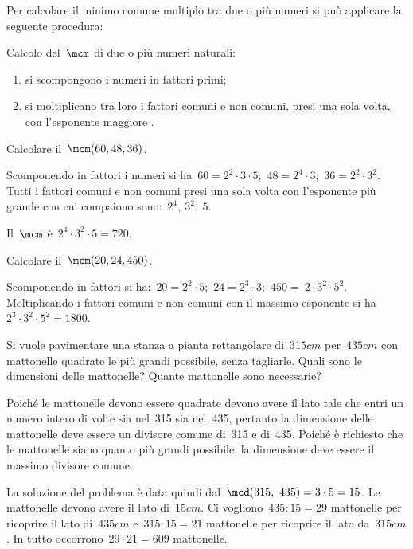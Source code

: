 Per calcolare il minimo comune multiplo tra due o più numeri si può 
applicare la seguente procedura:

\begin{procedura}{}{}
Calcolo del~\(\mcm\) di due o più numeri naturali:
\begin{enumerate}[noitemsep, label=(\alph*)]
 \item si scompongono i numeri in fattori primi;
 \item si moltiplicano tra loro i fattori comuni e non comuni, 
  presi una sola volta, con l'esponente maggiore .
\end{enumerate}
\end{procedura}


 \begin{esempio}{}{}
 Calcolare il~\(\mcm(60,48,36)\).

Scomponendo in fattori i numeri si 
ha~\(60=2^2\cdot3\cdot5\);~\(48=2^4\cdot3\);~\(36 =2^2\cdot3^2\).
Tutti i fattori comuni e non comuni presi una sola volta con l'esponente 
più grande con cui compaiono sono:~\(2^4,~3^2,~5\).

Il~\(\mcm\) è~\(2^4\cdot3^2\cdot5=720\).
 \end{esempio}

 \begin{esempio}{}{}
 Calcolare il~\(\mcm(20,24,450)\).

Scomponendo in fattori si 
ha:~\(20=2^2\cdot5\);~\(24=2^3\cdot3\);~\(450 =~2\cdot3^2\cdot5^2\).
Moltiplicando i fattori comuni e non comuni con il massimo esponente 
si ha~\(2^3\cdot3^2\cdot5^2=1800\).
 \end{esempio}

 \begin{esempio}{}{}
Si vuole pavimentare una stanza a pianta rettangolare di~\(315\unit{cm}\) 
per~\(435\unit{cm}\) con mattonelle quadrate le più grandi possibile, 
senza tagliarle. 
Quali sono le dimensioni delle  mattonelle? 
Quante mattonelle sono necessarie?

Poiché le mattonelle devono essere quadrate devono avere il lato tale che 
entri un numero intero di volte sia nel~315 sia nel~435, pertanto la 
dimensione delle mattonelle deve essere un divisore comune
di~315 e di~435. Poiché è richiesto che le mattonelle siano quanto più 
grandi possibile, la dimensione deve essere il massimo divisore comune.
\begin{center}
 
% 
\end{center}
La soluzione del problema è data quindi dal~\(\mcd(315,~435)=3 \cdot 5=15\). 
Le mattonelle devono avere il lato di~\(15\unit{cm}\).
Ci vogliono~\(435:15=29\) mattonelle per ricoprire il lato 
di~\(435\unit{cm}\) e~\(315:15=21\) mattonelle per ricoprire il lato
da~\(315\unit{cm}\). In tutto occorrono~\(29\cdot21=609\) mattonelle.
\end{esempio}

